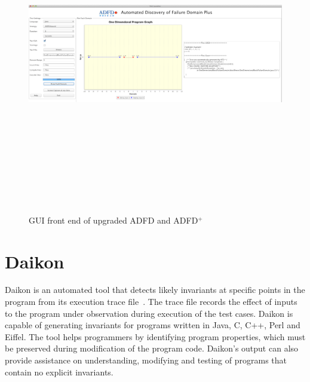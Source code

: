 \begin{figure}
\centering
\centerline{\includegraphics[width=22cm,height=14cm]{chapter7/adfdUpgraded1.png}}
\caption{GUI front end of upgraded ADFD and ADFD$^+$}
\label{fig:adfdUpgraded}
\end{figure}



\clearpage
\newpage
\section{Daikon}
Daikon is an automated tool that detects likely invariants at specific points in the program from its execution trace file~\cite{ernst2007daikon}. The trace file records the effect of inputs to the program under observation during execution of the test cases. Daikon is capable of generating invariants for programs written in Java, C, C++, Perl and Eiffel. The tool helps programmers by identifying program properties, which must be preserved during modification of the program code. Daikon's output can also provide assistance on understanding, modifying and testing of programs that contain no explicit invariants.

